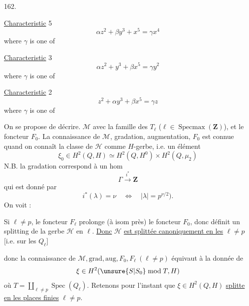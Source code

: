162.

\uline{Characteristic} 5
\[
\alpha z^2+\beta y^3+x^5=\gamma x^4
\]
where $\gamma$ is one of

\uline{Characteristic} 3
\[
\alpha z^2+y^3+\beta x^5=\gamma y^2
\]
where $\gamma$ is one of

\uline{Characteristic} 2
\[
z^2+\alpha y^3+\beta x^5=\gamma z
\]
where $\gamma$ is one of

On se propose de décrire.  $\mathcal M$  avec la famille des $T_\ell$ ($\ell\in\operatorname{Specmax}(\mathbf Z)$),  et le foncteur $F_0$. La connaissance de $\mathcal M$, gradation, augmentation, $F_0$ est connue quand on connaît la classe de $\mathcal H$ comme $H$-gerbe, i.e. un élément
\[
\xi_0\in H^2(Q,H)\simeq H^2(Q,H^0)\times H^2(Q,\mu_2)
\]
N.B. la gradation correspond à un hom
\[
\Gamma\xrightarrow{i^*}\mathbf Z
\]
qui est donné par
\[
i^*(\lambda)=\nu\quad\Longleftrightarrow\quad |\lambda|=p^{\nu/2}).
\]
On voit :

Si $\ell\ne p$, le foncteur $F_\ell$ prolonge (à isom près) le foncteur $F_0$, donc  définit un splitting de la gerbe $\mathcal H$  en $\ell$. \uline{Donc} $\mathcal H$ \uline{est splittée canoniquement en les} $\ell\ne p$ [i.e. sur les $Q_\ell$]

donc la connaissance de  $\mathcal M,\mathrm{grad},\mathrm{aug},F_0,F_\ell\ (\ell\ne p)$ équivaut à la donnée de
\[
\xi\in H^2(\unsure{S|S_0}\bmod T,H)
\]
où $T=\coprod_{\ell\ne p}\operatorname{Spec}(Q_\ell)$. Retenons pour l'instant que $\xi\in H^2(Q,H)$ \uline{splitte en les places finies} $\ell\ne p$.


